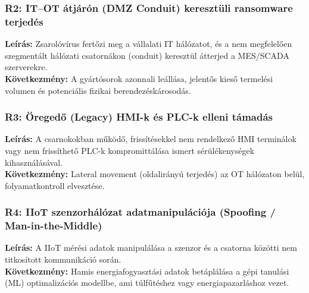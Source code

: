 \subsubsection*{R2: IT--OT átjárón (DMZ Conduit) keresztüli ransomware terjedés} 
\textbf{Leírás:} Zsarolóvírus fertőzi meg a vállalati IT hálózatot, és a nem megfelelően szegmentált hálózati csatornákon (conduit) keresztül átterjed a MES/SCADA szerverekre. \\
\textbf{Következmény:} A gyártósorok azonnali leállása, jelentős kieső termelési volumen és potenciális fizikai berendezéskárosodás.
\subsubsection*{R3: Öregedő (Legacy) HMI-k és PLC-k elleni támadás}
\textbf{Leírás:} A csarnokokban működő, frissítésekkel nem rendelkező HMI terminálok vagy nem frissíthető PLC-k kompromittálása ismert sérülékenységek kihasználásával. \\
\textbf{Következmény:} Lateral movement (oldalirányú terjedés) az OT hálózaton belül, folyamatkontroll elvesztése.
\subsubsection*{R4: IIoT szenzorhálózat adatmanipulációja (Spoofing / Man-in-the-Middle)}
\textbf{Leírás:} A IIoT mérési adatok manipulálása a szenzor és a csatorna közötti nem titkosított kommunikáció során. \\
\textbf{Következmény:} Hamis energiafogyasztási adatok betáplálása a gépi tanulási (ML) optimalizációs modellbe, ami túlfűtéshez vagy energiapazarláshoz vezet.


